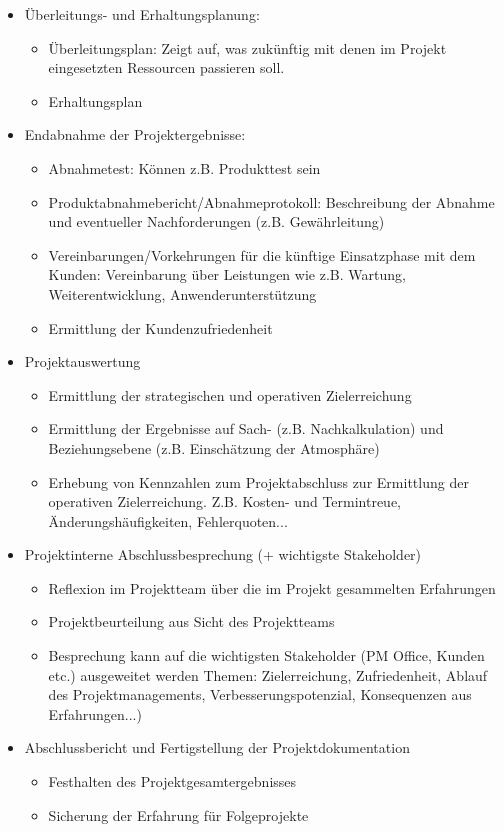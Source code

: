 \documentclass[11pt,a4paper]{article}
\begin{document}
\begin{itemize}

\item Überleitungs- und Erhaltungsplanung:
	\begin{itemize}
	\item Überleitungsplan: Zeigt auf, was zukünftig mit denen im Projekt
eingesetzten Ressourcen passieren soll.
	\item Erhaltungsplan
	\end{itemize}
	
\item Endabnahme der Projektergebnisse:
	\begin{itemize}
	\item Abnahmetest: Können z.B. Produkttest sein
	\item Produktabnahmebericht/Abnahmeprotokoll: Beschreibung der
Abnahme und eventueller Nachforderungen (z.B. Gewährleitung)
	\item Vereinbarungen/Vorkehrungen für die künftige Einsatzphase mit dem
Kunden: Vereinbarung über Leistungen wie z.B. Wartung,
Weiterentwicklung, Anwenderunterstützung
	\item Ermittlung der Kundenzufriedenheit
	\end{itemize}
	
\item Projektauswertung
	\begin{itemize}
	\item Ermittlung der strategischen und operativen Zielerreichung
	\item Ermittlung der Ergebnisse auf Sach- (z.B. Nachkalkulation) und
Beziehungsebene (z.B. Einschätzung der Atmosphäre)
	\item Erhebung von Kennzahlen zum Projektabschluss zur Ermittlung der
operativen Zielerreichung. Z.B. Kosten- und Termintreue,
Änderungshäufigkeiten, Fehlerquoten...
	\end{itemize}
	
\item Projektinterne Abschlussbesprechung (+ wichtigste Stakeholder)
	\begin{itemize}
	\item Reflexion im Projektteam über die im Projekt gesammelten
Erfahrungen
	\item Projektbeurteilung aus Sicht des Projektteams
	\item Besprechung kann auf die wichtigsten Stakeholder (PM Office, Kunden
etc.) ausgeweitet werden
Themen: Zielerreichung, Zufriedenheit, Ablauf des
Projektmanagements, Verbesserungspotenzial, Konsequenzen aus
Erfahrungen...)
	\end{itemize}
	
\item Abschlussbericht und Fertigstellung der Projektdokumentation

	\begin{itemize}
	\item Festhalten des Projektgesamtergebnisses
	\item Sicherung der Erfahrung für Folgeprojekte
	\end{itemize}
	

\end{itemize}
\pagebreak
\end{document}
